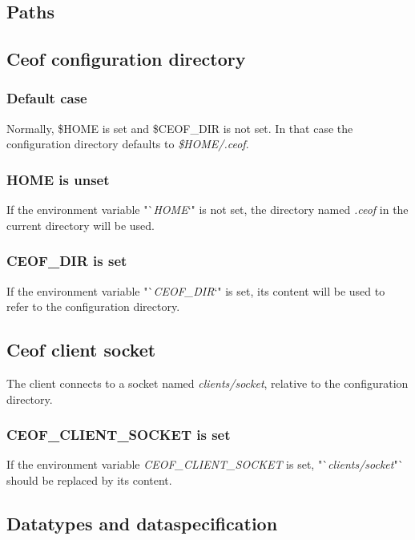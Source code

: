 \documentclass[12pt,a4paper]{book}
\begin{document}
\subsection{Paths}
\subsection{Ceof configuration directory}
\subsubsection{Default case}
Normally, \$HOME is set and \$CEOF\_DIR is not set. In that case
the configuration directory defaults to \textit{\$HOME/.ceof}.
\subsubsection{HOME is unset}
If the environment variable "`\textit{HOME}`" is not set,
the directory named \textit{.ceof} in the current directory will be used.
\subsubsection{CEOF\_DIR is set}
If the environment variable "`\textit{CEOF\_DIR}`" is set,
its content will be used to refer to the configuration directory.
\subsection{Ceof client socket}
The client connects to a socket named \textit{clients/socket}, relative
to the configuration directory.
\subsubsection{CEOF\_CLIENT\_SOCKET is set}
If the environment variable \textit{CEOF\_CLIENT\_SOCKET} is set,
"`\textit{clients/socket}"` should be replaced by its content.
\subsection{Datatypes and dataspecification}
\end{document}
